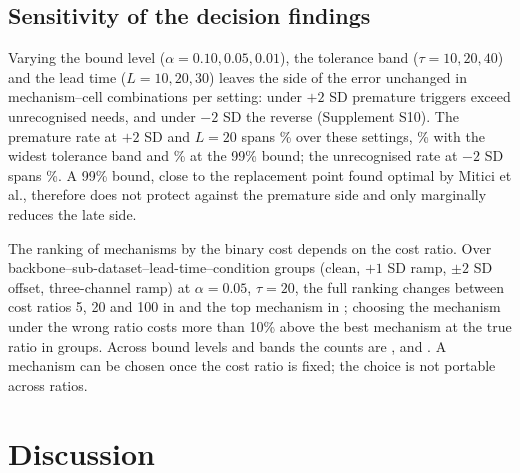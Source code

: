 \documentclass[11pt,a4paper]{article}
\begin{document}
\subsection{Sensitivity of the decision findings}\label{sec:sens}
Varying the bound level ($\alpha=0.10,0.05,0.01$), the tolerance band ($\tau=10,20,40$) and the lead time ($L=10,20,30$) leaves the side of the error unchanged in \RVSensAllOK{} \RVSensDir{} mechanism--cell combinations per setting: under $+2$ SD premature triggers exceed unrecognised needs, and under $-2$ SD the reverse (Supplement S10). The premature rate at $+2$ SD and $L=20$ spans \RVSensPremRange\% over these settings, \RVSensPremTolForty\% with the widest tolerance band and \RVSensPremAlphaOne\% at the 99\% bound; the unrecognised rate at $-2$ SD spans \RVSensLateRange\%. A 99\% bound, close to the replacement point found optimal by Mitici et al.,\cite{mitici2023} therefore does not protect against the premature side and only marginally reduces the late side.

The ranking of mechanisms by the binary cost depends on the cost ratio. Over \RVRankGroups{} backbone--sub-dataset--lead-time--condition groups (clean, $+1$ SD ramp, $\pm2$ SD offset, three-channel ramp) at $\alpha=0.05$, $\tau=20$, the full ranking changes between cost ratios 5, 20 and 100 in \RVRankChg{} and the top mechanism in \RVTopChg; choosing the mechanism under the wrong ratio costs more than 10\% above the best mechanism at the true ratio in \RVRegretTen{} groups. Across bound levels and bands the counts are \RVRankChgRange, \RVTopChgRange{} and \RVRegretTenRange. A mechanism can be chosen once the cost ratio is fixed; the choice is not portable across ratios.

\section{Discussion}
\end{document}

